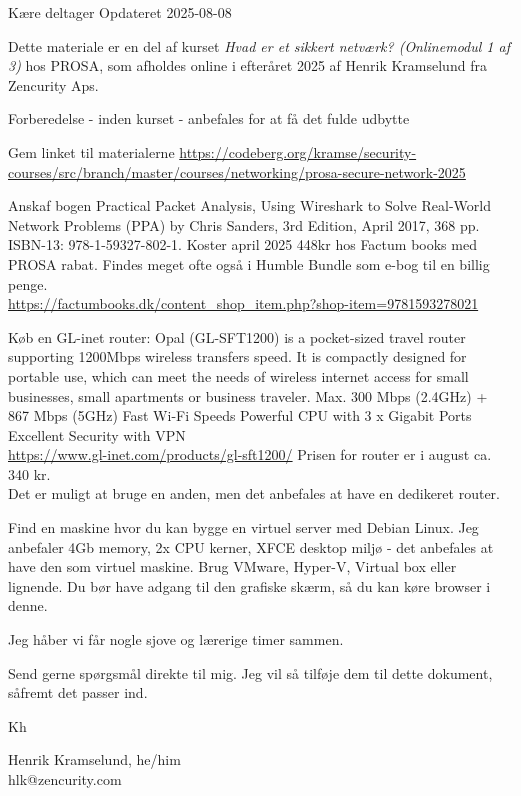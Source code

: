 \documentclass[a4paper,11pt,notitlepage,landscape]{report}
\begin{document}
\rm
{}

\newcommand{\subject}[1]{PROSA: Hvad er et sikkert netværk?}


\normal
Kære deltager
\hfill Opdateret 2025-08-08

Dette materiale er en del af kurset
\emph{Hvad er et sikkert netværk? (Onlinemodul 1 af 3)} hos PROSA, som afholdes online i efteråret 2025 af Henrik Kramselund fra Zencurity Aps.

Forberedelse - inden kurset - anbefales for at få det fulde udbytte
\begin{list1}
\item[\faSquareO] Gem linket til materialerne
\url{https://codeberg.org/kramse/security-courses/src/branch/master/courses/networking/prosa-secure-network-2025
}

\item[\faSquareO] Anskaf bogen Practical Packet Analysis, Using Wireshark to Solve Real-World Network Problems (PPA) by Chris Sanders, 3rd Edition, April 2017, 368 pp. ISBN-13: 978-1-59327-802-1. Koster april 2025 448kr hos Factum books med PROSA rabat. Findes meget ofte også i Humble Bundle som e-bog til en billig penge.\\
\url{https://factumbooks.dk/content_shop_item.php?shop-item=9781593278021}
\item[\faSquareO] Køb en GL-inet router: Opal (GL-SFT1200) is a pocket-sized travel router supporting 1200Mbps wireless transfers speed. It is compactly designed for portable use, which can meet the needs of wireless internet access for small businesses, small apartments or business traveler. Max. 300 Mbps (2.4GHz) + 867 Mbps (5GHz) Fast Wi-Fi Speeds Powerful CPU with 3 x Gigabit Ports Excellent Security with VPN\\
 \url{https://www.gl-inet.com/products/gl-sft1200/}
Prisen for router er i august ca. 340 kr.\\
Det er muligt at bruge en anden, men det anbefales at have en dedikeret router.
\item[\faSquareO] Find en maskine hvor du kan bygge en virtuel server med Debian Linux. Jeg anbefaler  4Gb memory, 2x CPU kerner, XFCE desktop miljø - det anbefales at have den som virtuel maskine. Brug VMware, Hyper-V, Virtual box eller lignende. Du bør have adgang til den grafiske skærm, så du kan køre browser i denne.

\end{list1}

Jeg håber vi får nogle sjove og lærerige timer sammen.

Send gerne spørgsmål direkte til mig. Jeg vil så tilføje dem til dette dokument, såfremt det passer ind.

Kh

Henrik Kramselund, he/him\\
hlk@zencurity.com
\end{document}
